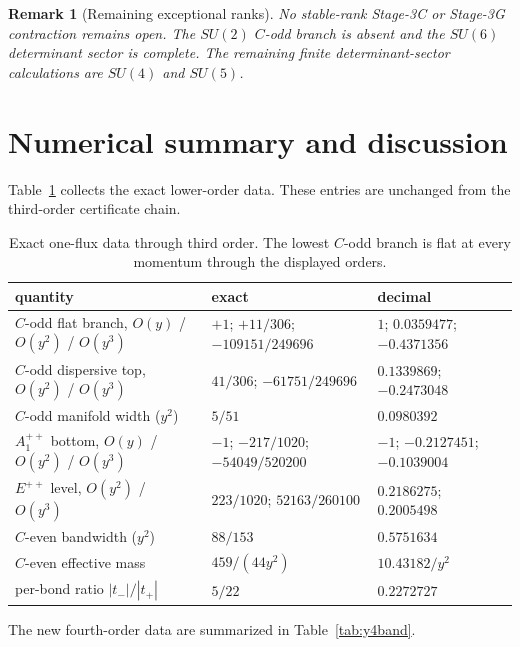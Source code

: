 \documentclass[11pt]{article}
\newtheorem{remark}[theorem]{Remark}
\begin{document}
\begin{remark}[Remaining exceptional ranks]
No stable-rank Stage-3C or Stage-3G contraction remains open. The $SU(2)$
$C$-odd branch is absent and the $SU(6)$ determinant sector is complete. The
remaining finite determinant-sector calculations are $SU(4)$ and $SU(5)$.
\end{remark}

\section{Numerical summary and discussion}
\label{sec:numbers}

Table~\ref{tab:lowerbands} collects the exact lower-order data. These entries
are unchanged from the third-order certificate chain.

\begin{table}[ht]
\centering
\scriptsize
\begin{tabular}{lll}
\toprule
quantity & exact & decimal \\
\midrule
$C$-odd flat branch, $O(y)$ / $O(y^2)$ / $O(y^3)$ &
$+1$; $+11/306$; $-109151/249696$ &
$1$; $0.0359477$; $-0.4371356$ \\
$C$-odd dispersive top, $O(y^2)$ / $O(y^3)$ &
$41/306$; $-61751/249696$ & $0.1339869$; $-0.2473048$ \\
$C$-odd manifold width ($y^2$) & $5/51$ & $0.0980392$ \\
$A_1^{++}$ bottom, $O(y)$ / $O(y^2)$ / $O(y^3)$ &
$-1$; $-217/1020$; $-54049/520200$ &
$-1$; $-0.2127451$; $-0.1039004$ \\
$E^{++}$ level, $O(y^2)$ / $O(y^3)$ &
$223/1020$; $52163/260100$ & $0.2186275$; $0.2005498$ \\
$C$-even bandwidth ($y^2$) & $88/153$ & $0.5751634$ \\
$C$-even effective mass & $459/(44y^2)$ & $10.43182/y^2$ \\
per-bond ratio $|t_-|/|t_+|$ & $5/22$ & $0.2272727$ \\
\bottomrule
\end{tabular}
\caption{Exact one-flux data through third order. The lowest $C$-odd branch
is flat at every momentum through the displayed orders.}
\label{tab:lowerbands}
\end{table}

The new fourth-order data are summarized in Table~\ref{tab:y4band}.
\end{document}
